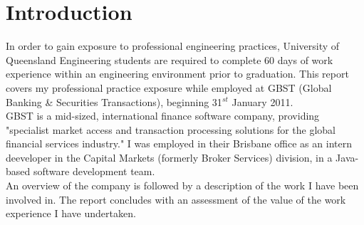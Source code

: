 \chapter{Introduction}

In order to gain exposure to professional engineering practices, University of Queensland Engineering students are required to complete 60 days of work experience within an engineering environment prior to graduation. This report covers my professional practice exposure while employed at GBST (Global Banking \& Securities Transactions), beginning 31$^{st}$ January 2011.
\\

GBST is a mid-sized, international finance software company, providing "specialist market access and transaction processing solutions for the global financial services industry." \cite{asx} I was employed in their Brisbane office as an intern deeveloper in the Capital Markets (formerly Broker Services) division, in a Java-based software development team.
\\

An overview of the company is followed by a description of the work I have been involved in. The report concludes with an assessment of the value of the work experience I have undertaken.

\begin{comment}
lorem ipsum blah blah blah
\end{comment}
